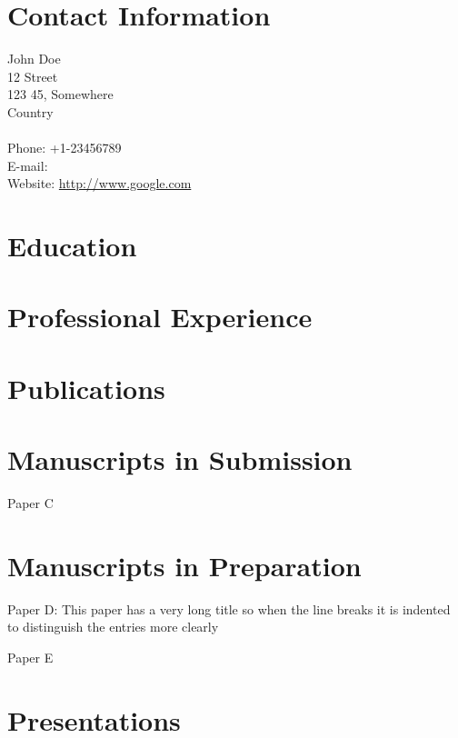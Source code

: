 \documentclass{karencv}
\begin{document}
\section{Contact Information}
John Doe\\
12 Street\\
123 45, Somewhere~\\
Country\\~\\
Phone: +1-23456789\\
E-mail: \\
Website: \url{http://www.google.com}


\section{Education}

\section{Professional Experience}

\section{Publications}



\section{Manuscripts in Submission}
Paper C
\section{Manuscripts in Preparation}

\begin{articlelist}
\item Paper D: This paper has a very long title so when the line breaks it is indented to distinguish the entries more clearly
\item Paper E
\end{articlelist}

\section{Presentations}
\end{document}
